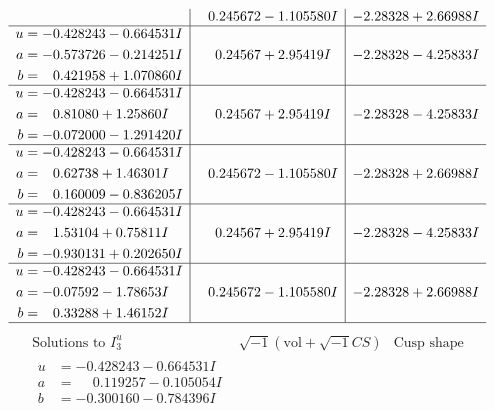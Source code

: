 \documentclass[1p]{elsarticle_modified}
\theoremstyle{definition}
\newcommand{\I}{\sqrt{-1}}
\begin{document}
$$\begin{array}{c|c|c}
 & \phantom{-}0.245672 - 1.105580 I & -2.28328 + 2.66988 I \\ \hline\begin{aligned}
u &= -0.428243 - 0.664531 I \\
a &= -0.573726 - 0.214251 I \\
b &= \phantom{-}0.421958 + 1.070860 I\end{aligned}
 & \phantom{-}0.24567 + 2.95419 I & -2.28328 - 4.25833 I \\ \hline\begin{aligned}
u &= -0.428243 - 0.664531 I \\
a &= \phantom{-}0.81080 + 1.25860 I \\
b &= -0.072000 - 1.291420 I\end{aligned}
 & \phantom{-}0.24567 + 2.95419 I & -2.28328 - 4.25833 I \\ \hline\begin{aligned}
u &= -0.428243 - 0.664531 I \\
a &= \phantom{-}0.62738 + 1.46301 I \\
b &= \phantom{-}0.160009 - 0.836205 I\end{aligned}
 & \phantom{-}0.245672 - 1.105580 I & -2.28328 + 2.66988 I \\ \hline\begin{aligned}
u &= -0.428243 - 0.664531 I \\
a &= \phantom{-}1.53104 + 0.75811 I \\
b &= -0.930131 + 0.202650 I\end{aligned}
 & \phantom{-}0.24567 + 2.95419 I & -2.28328 - 4.25833 I \\ \hline\begin{aligned}
u &= -0.428243 - 0.664531 I \\
a &= -0.07592 - 1.78653 I \\
b &= \phantom{-}0.33288 + 1.46152 I\end{aligned}
 & \phantom{-}0.245672 - 1.105580 I & -2.28328 + 2.66988 I\\
 \hline 
 \end{array}$$\newpage$$\begin{array}{c|c|c}  
\text{Solutions to }I^u_{3}& \I (\text{vol} + \sqrt{-1}CS) & \text{Cusp shape}\\
 \hline 
\begin{aligned}
u &= -0.428243 - 0.664531 I \\
a &= \phantom{-}0.119257 - 0.105054 I \\
b &= -0.300160 - 0.784396 I\end{aligned}

\end{array}$$
\end{document}
